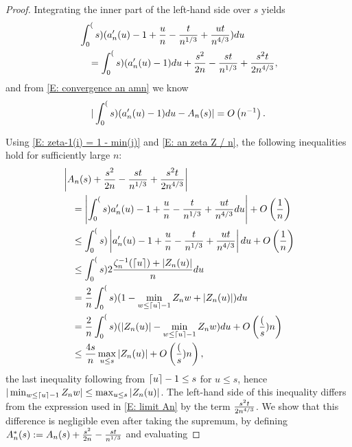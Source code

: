 \begin{proof}
	Integrating the inner part of the left-hand side over $s$ yields
	\begin{equation}
	\begin{aligned}
	&\int_{0}^(s) (a'_n(u) - 1 + \frac{u}{n} - \frac{t}{n^{1 / 3}} + \frac{ut}{n^{4 / 3}}) du \\
	&\quad = \int_{0}^(s)(a'_n(u) - 1) du + \frac{s^2}{2n} - \frac{st}{n^{1 / 3}} + \frac{s^2t}{2n^{4 / 3}},
	\end{aligned}
	\end{equation}
	and from \eqref{E: convergence an amn} we know
	\begin{equation} \label{E: convergence amn An}
	|\int_{0}^(s)(a'_n(u) - 1) du - A_n(s)| = O\left(n^{-1}\right).
	\end{equation}
	
	Using \eqref{E: zeta-1(i) = 1 - min(j)} and \eqref{E: an zeta Z / n}, the following inequalities hold for sufficiently large $n$:
	\begin{equation} \label{E: int an <= 4s/n maxZ + O()}
	\begin{aligned}
	&\left| A_n(s) + \frac{s^2}{2n} - \frac{st}{n^{1 / 3}}  + \frac{s^2t}{2n^{4 / 3}}  \right| \\
	&\quad = \left| \int_{0}^(s) a'_n(u) - 1 + \frac{u}{n} - \frac{t}{n^{1 / 3}} + \frac{ut}{n^{4 / 3}} du \right| + O\left(\frac{1}{n}\right) \\
	&\quad \leq \int_{0}^(s) \left|a'_n(u) - 1 + \frac{u}{n} - \frac{t}{n^{1 / 3}} + \frac{ut}{n^{4 / 3}} \right| du + O\left(\frac{1}{n}\right) \\ 
	&\quad \leq \int_{0}^(s) 2 \frac{\zeta^{-1}_n(\lceil u\rceil) + |Z_n(u)|}{n} du \\ 
	&\quad = \frac{2}{n}  \int_{0}^(s) (1-\min_{w \leq \lceil u\rceil-1} Z_n{w}  + |Z_n(u)| )du \\ 
	&\quad = \frac{2}{n}  \int_{0}^(s) (|Z_n(u)| - \min_{w \leq \lceil u\rceil-1} Z_n{w}) du + O\left(\frac(s){n}\right) \\ 
	&\quad \leq \frac{4s}{n} \max_{u \leq s} |Z_n(u)| + O\left(\frac(s){n}\right),
	\end{aligned}
	\end{equation}
    the last inequality following from $\lceil u\rceil-1 \leq s$ for $u\leq s$, hence $|\min_{w \leq \lceil u\rceil-1}Z_n{w}| \leq \max_{u \leq s}|Z_n(u)|$.
    The left-hand side of this inequality differs from the expression used in \eqref{E: limit An} by the term $\frac{s^2t}{2n^{4 / 3}}$.
    We show that this difference is negligible even after taking the supremum, by defining $A^*_n(s) := A_n(s) + \frac{s^2}{2n} - \frac{st}{n^{1 / 3}}$
    and evaluating

\end{proof}
